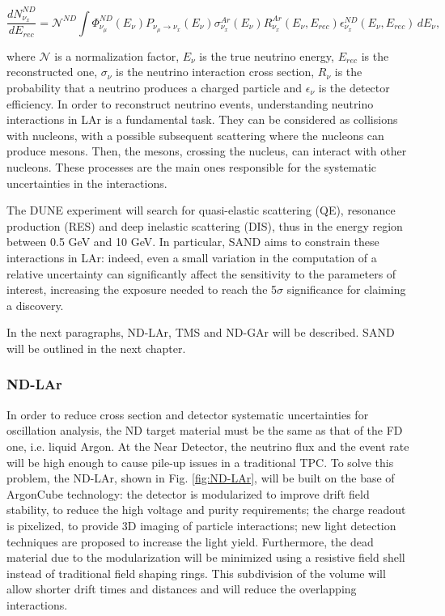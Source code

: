 \begin{equation}
\label{ND_rate}
    \frac{dN^{ND}_{\nu_x}}{dE_{rec}} = \mathcal{N}^{ND} \int \Phi^{ND}_{\nu_{\mu}}(E_\nu) P_{\nu_{\mu}\rightarrow \nu_x}(E_\nu) \sigma^{Ar}_{\nu_x}(E_\nu)R^{Ar}_{\nu_x}(E_\nu, E_{rec}) \epsilon^{ND}_{\nu_x}(E_\nu, E_{rec}) \,dE_\nu, 
\end{equation}

where $\mathcal{N}$ is a normalization factor, $E_\nu$ is the true neutrino energy, $E_{rec}$ is the reconstructed one, $\sigma_\nu$ is the neutrino interaction cross section, $R_\nu$ is the probability that a neutrino produces a charged particle and $\epsilon_\nu$ is the detector efficiency.
In order to reconstruct neutrino events, understanding neutrino interactions in LAr is a fundamental task. They can be considered as collisions with nucleons, with a possible subsequent scattering where the nucleons can produce mesons. Then, the mesons, crossing the nucleus, can interact with other nucleons. These processes are the main ones responsible for the systematic uncertainties in the interactions. 

The DUNE experiment will search for quasi-elastic scattering (QE), resonance production (RES) and deep inelastic scattering (DIS), thus in the energy region between 0.5 GeV and 10 GeV. In particular, SAND aims to constrain these interactions in LAr: indeed, even a small variation in the computation of a relative uncertainty can significantly affect the sensitivity to the parameters of interest, increasing the exposure needed to reach the 5$\sigma$ significance for claiming a discovery.

In the next paragraphs, ND-LAr, TMS and ND-GAr will be described. SAND will be outlined in the next chapter.

\subsubsection{ND-LAr}
In order to reduce cross section and detector systematic uncertainties for oscillation analysis, the ND target material must be the same as that of the FD one, i.e. liquid Argon. At the Near Detector, the neutrino flux and the event rate will be high enough to cause pile-up issues in a traditional TPC. To solve this problem, the ND-LAr, shown in Fig. \ref{fig:ND-LAr}, will be built on the base of ArgonCube technology: the detector is modularized to improve drift field stability, to reduce the high voltage and purity requirements; the charge readout is pixelized, to provide 3D imaging of particle interactions; new light detection techniques are proposed to increase the light yield. Furthermore, the dead material due to the modularization will be minimized using a resistive field shell instead of traditional field shaping rings. This subdivision of the volume will allow shorter drift times and distances and will reduce the overlapping interactions. 

